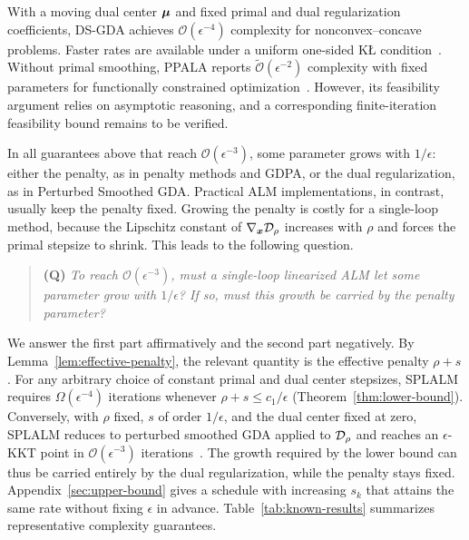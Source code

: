 With a moving dual center $\bm{\mu}$ and fixed primal and dual regularization
coefficients, DS-GDA achieves $\mathcal O(\epsilon^{-4})$ complexity
for nonconvex--concave problems. Faster rates are available under a
uniform one-sided K{\L} condition~\cite{zheng2023universal}.
Without primal smoothing, PPALA reports
$\widetilde{\mathcal O}(\epsilon^{-2})$ complexity with fixed parameters
for functionally constrained optimization~\cite{kim2024fast}.
However, its feasibility argument relies on asymptotic reasoning,
and a corresponding finite-iteration feasibility bound remains
to be verified.

In all guarantees above that reach $\mathcal O(\epsilon^{-3})$, some
parameter grows with $1/\epsilon$: either the penalty, as in penalty methods
and GDPA, or the dual regularization, as in Perturbed Smoothed GDA. Practical
ALM implementations, in contrast, usually keep the penalty fixed. Growing the
penalty is costly for a single-loop method, because the Lipschitz constant of
$\nabla_{\bm{x}}\mathcal{D}_\rho$ increases with $\rho$ and forces the primal stepsize
to shrink. This leads to the following question.
\begin{quote}
  \textbf{(Q)}
  \emph{To reach $\mathcal O(\epsilon^{-3})$, must a single-loop linearized ALM
  let some parameter grow with $1/\epsilon$? If so, must this growth be
  carried by the penalty parameter?}
\end{quote}
We answer the first part affirmatively and the second part negatively. By
Lemma~\ref{lem:effective-penalty}, the relevant quantity is the effective
penalty $\rho+s$. For any arbitrary choice of constant primal and dual center
stepsizes, SPLALM requires $\Omega(\epsilon^{-4})$ iterations whenever
$\rho+s\le c_1/\epsilon$ (Theorem~\ref{thm:lower-bound}). Conversely, with
$\rho$ fixed, $s$ of order $1/\epsilon$, and the dual center fixed at zero,
SPLALM reduces to perturbed smoothed GDA applied to $\mathcal{D}_\rho$ and reaches
an $\epsilon$-KKT point in $\mathcal O(\epsilon^{-3})$
iterations~\cite[Theorem~3.3]{li2026smoothing}.
The growth required by the lower bound can thus be carried entirely by the
dual regularization, while the penalty stays fixed.
Appendix~\ref{sec:upper-bound} gives a schedule with increasing $s_k$ that
attains the same rate without fixing $\epsilon$ in advance.
Table~\ref{tab:known-results} summarizes representative complexity
guarantees.


